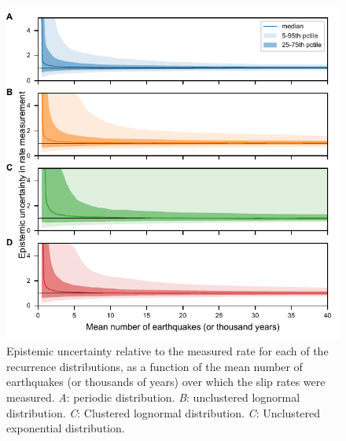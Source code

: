 \documentclass[se, manuscript]{copernicus}
\begin{document}
\clearpage

\begin{figure}[t]
  \includegraphics[width=12cm]{./figures/epist_unc.pdf}
  \caption{Epistemic uncertainty relative to the measured rate for each of the 
  recurrence distributions, as a function of the mean number of earthquakes (or 
  thousands of years) over which the slip rates were measured. \emph{A}: 
  periodic distribution. \emph{B}: unclustered lognormal distribution. 
  \emph{C}: Clustered lognormal distribution. \emph{C}: Unclustered exponential 
  distribution.
  \label{epist_unc}}
\end{figure}

\clearpage
\end{document}
